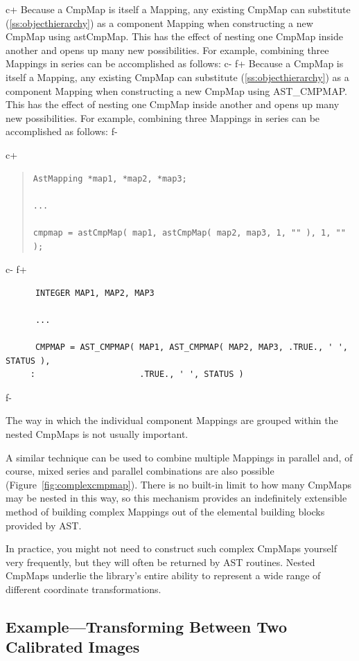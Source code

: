\documentclass[twoside,11pt]{article}
\newcommand{\secref}[1]{\S\ref{#1}}
\renewcommand{\secref}[1]{\ref{#1}}
\begin{document}
c+
Because a CmpMap is itself a Mapping, any existing CmpMap can
substitute (\secref{ss:objecthierarchy}) as a component Mapping when
constructing a new CmpMap using astCmpMap. This has the effect of
nesting one CmpMap inside another and opens up many new possibilities.
For example, combining three Mappings in series can be accomplished as
follows:
c-
f+
Because a CmpMap is itself a Mapping, any existing CmpMap can
substitute (\secref{ss:objecthierarchy}) as a component Mapping when
constructing a new CmpMap using AST\_CMPMAP. This has the effect of
nesting one CmpMap inside another and opens up many new possibilities.
For example, combining three Mappings in series can be accomplished as
follows:
f-

c+
\begin{quote}
\small
\begin{verbatim}
AstMapping *map1, *map2, *map3;

...

cmpmap = astCmpMap( map1, astCmpMap( map2, map3, 1, "" ), 1, "" );
\end{verbatim}
\normalsize
\end{quote}
c-
f+
\small
\begin{verbatim}
      INTEGER MAP1, MAP2, MAP3

      ...

      CMPMAP = AST_CMPMAP( MAP1, AST_CMPMAP( MAP2, MAP3, .TRUE., ' ', STATUS ),
     :                     .TRUE., ' ', STATUS )
\end{verbatim}
\normalsize
f-

The way in which the individual component Mappings are grouped within
the nested CmpMaps is not usually important.

A similar technique can be used to combine multiple Mappings in
parallel and, of course, mixed series and parallel combinations are
also possible (Figure~\ref{fig:complexcmpmap}).  There is no built-in
limit to how many CmpMaps may be nested in this way, so this mechanism
provides an indefinitely extensible method of building complex
Mappings out of the elemental building blocks provided by AST.

In practice, you might not need to construct such complex CmpMaps
yourself very frequently, but they will often be returned by AST
routines.  Nested CmpMaps underlie the library's entire ability to
represent a wide range of different coordinate transformations.

\subsection{\label{ss:cmpmapexample}Example---Transforming Between Two Calibrated Images}
\end{document}
